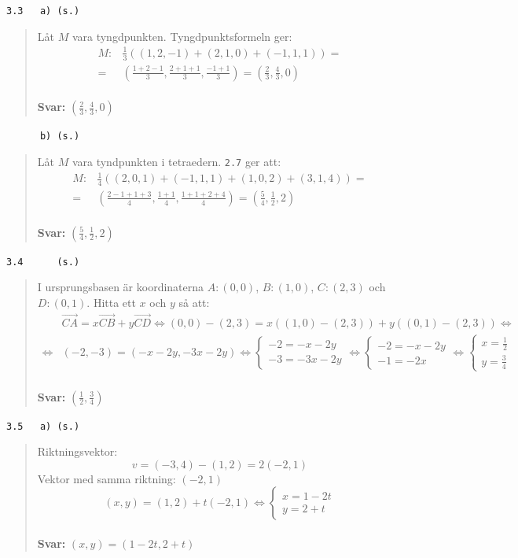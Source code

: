 \documentclass[a4paper]{article}
\newcommand{\tskcol}[1]{\textcolor{tskcol}{#1}}
\newcommand{\vek}[1]{\overrightarrow{#1}}
\begin{document}
\texttt{\tskcol{3.3~~~a) (s.)}}
\begin{quotation}
	\noindent
	Låt $M$ vara tyngdpunkten. Tyngdpunktsformeln ger:
	\begin{align*}
	M:&\frac{1}{3}((1,2,-1)+(2,1,0)+(-1,1,1))= \\ =
	&(\frac{1+2-1}{3},\frac{2+1+1}{3},\frac{-1+1}{3})=
	(\frac{2}{3},\frac{4}{3},0)
	\end{align*}
	\\
	\textbf{Svar:} $(\frac{2}{3},\frac{4}{3},0)$
\end{quotation}

\texttt{\tskcol{~~~~~~b) (s.)}}
\begin{quotation}
	\noindent
	Låt $M$ vara tyndpunkten i tetraedern. \texttt{\tskcol{2.7}} ger att:
	\begin{align*}
	M:&\frac{1}{4}((2,0,1)+(-1,1,1)+(1,0,2)+(3,1,4))= \\ =
	&(\frac{2-1+1+3}{4},\frac{1+1}{4},\frac{1+1+2+4}{4})=
	(\frac{5}{4},\frac{1}{2},2)
	\end{align*}
	\\
	\textbf{Svar:} $(\frac{5}{4},\frac{1}{2},2)$
\end{quotation}

\texttt{\tskcol{3.4~~~~~ (s.)}}
\begin{quotation}
	\noindent
	I ursprungsbasen är koordinaterna $A:(0,0)$, $B:(1,0)$, $C:(2,3)$ och $D:(0,1)$.
	Hitta ett $x$ och $y$ så att:
	\begin{align*}
	&\vek{CA}=x\vek{CB}+y\vek{CD} \Leftrightarrow
	(0,0)-(2,3)=x((1,0)-(2,3))+y((0,1)-(2,3)) \Leftrightarrow \\ \Leftrightarrow
	&(-2,-3)=(-x-2y,-3x-2y) \Leftrightarrow
	\begin{cases}
	-2=-x-2y \\
	-3=-3x-2y
	\end{cases} \Leftrightarrow
	\begin{cases}
	-2=-x-2y \\
	-1=-2x
	\end{cases} \Leftrightarrow
	\begin{cases}
	x=\frac{1}{2} \\
	y=\frac{3}{4}
	\end{cases}
	\end{align*}
	\\
	\textbf{Svar:} $(\frac{1}{2},\frac{3}{4})$
\end{quotation}

\texttt{\tskcol{3.5~~~a) (s.)}}
\begin{quotation}
	\noindent
	Riktningsvektor:
	\[v=(-3,4)-(1,2)=2(-2,1)\]
	Vektor med samma riktning: $(-2,1)$
	\[(x,y)=(1,2)+t(-2,1) \Leftrightarrow
	\begin{cases}
	x=1-2t \\
	y=2+t
	\end{cases}\]
	\\
	\textbf{Svar:} $(x,y)=(1-2t,2+t)$
\end{quotation}
\end{document}
